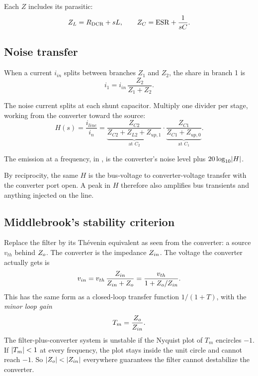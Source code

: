 Each $Z$ includes its parasitic:
\[
	Z_L = R_{\mathrm{DCR}} + sL, \qquad Z_C = \mathrm{ESR} + \frac{1}{sC}.
\]

\subsection{Noise transfer}

When a current $i_{in}$ splits between branches $Z_1$ and $Z_2$, the share in
branch 1 is
\begin{equation}\label{eq:current-divider}
	i_1 = i_{in}\,\frac{Z_2}{Z_1 + Z_2}.
\end{equation}

The noise current splits at each shunt capacitor. Multiply one divider per
stage, working from the converter toward the source:
\begin{equation}\label{eq:H-ladder}
	H(s) = \frac{i_{line}}{i_n}
	= \underbrace{\frac{Z_{C2}}{Z_{C2} + Z_{L2} + Z_{up,1}}}_{\text{at } C_2}
	\cdot \underbrace{\frac{Z_{C1}}{Z_{C1} + Z_{up,0}}}_{\text{at } C_1}.
\end{equation}

The emission at a frequency, in \dBuA, is the converter's noise level plus
$20\log_{10}\lvert H\rvert$.

\begin{idea}
	By reciprocity, the same $H$ is the bus-voltage to converter-voltage transfer
	with the converter port open. A peak in $H$ therefore also amplifies bus
	transients and anything injected on the line.
\end{idea}

\subsection{Middlebrook's stability criterion}

\begin{derivation}
	Replace the filter by its Th\'evenin equivalent as seen from the converter:
	a source $v_{th}$ behind $Z_o$. The converter is the impedance $Z_{in}$.
	The voltage the converter actually gets is
	\[
		v_{in} = v_{th}\,\frac{Z_{in}}{Z_{in} + Z_o} = \frac{v_{th}}{1 + Z_o/Z_{in}}.
	\]
	This has the same form as a closed-loop transfer function $1/(1+T)$, with
	the \emph{minor loop gain}
	\[
		T_m = \frac{Z_o}{Z_{in}}.
	\]
	The filter-plus-converter system is unstable if the Nyquist plot of $T_m$
	encircles $-1$. If $\lvert T_m\rvert < 1$ at every frequency, the plot stays inside
	the unit circle and cannot reach $-1$. So $\lvert Z_o\rvert < \lvert Z_{in}\rvert$
	everywhere guarantees the filter cannot destabilize the converter.
\end{derivation}

